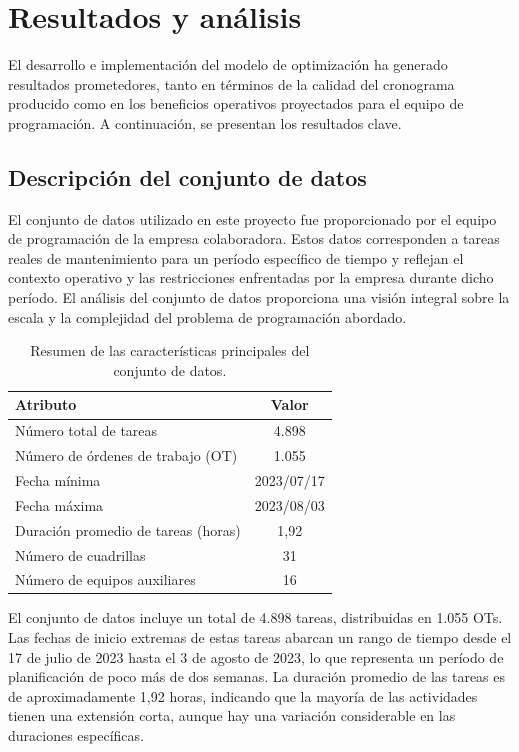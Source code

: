 \documentclass{article}
\begin{document}
\section{Resultados y análisis}

El desarrollo e implementación del modelo de optimización ha generado resultados prometedores, tanto en términos de la calidad del cronograma producido como en los beneficios operativos proyectados para el equipo de programación. A continuación, se presentan los resultados clave.


\subsection{Descripción del conjunto de datos}

El conjunto de datos utilizado en este proyecto fue proporcionado por el equipo de programación de la empresa colaboradora. Estos datos corresponden a tareas reales de mantenimiento para un período específico de tiempo y reflejan el contexto operativo y las restricciones enfrentadas por la empresa durante dicho período. El análisis del conjunto de datos proporciona una visión integral sobre la escala y la complejidad del problema de programación abordado.

\begin{table}[htbp]
    \centering
    \begin{tabular}{lc}
        \toprule
        \textbf{Atributo} & \textbf{Valor} \\
        \midrule
        Número total de tareas & 4.898 \\
        Número de órdenes de trabajo (OT) & 1.055 \\
        Fecha mínima & 2023/07/17 \\
        Fecha máxima & 2023/08/03 \\
        Duración promedio de tareas (horas) & 1,92 \\
        Número de cuadrillas & 31 \\
        Número de equipos auxiliares & 16 \\
        \bottomrule
    \end{tabular}
    \caption{Resumen de las características principales del conjunto de datos.}
    \label{tab:dataset_summary}
\end{table}


El conjunto de datos incluye un total de 4.898 tareas, distribuidas en 1.055 OTs. Las fechas de inicio extremas de estas tareas abarcan un rango de tiempo desde el 17 de julio de 2023 hasta el 3 de agosto de 2023, lo que representa un período de planificación de poco más de dos semanas. La duración promedio de las tareas es de aproximadamente 1,92 horas, indicando que la mayoría de las actividades tienen una extensión corta, aunque hay una variación considerable en las duraciones específicas.
\end{document}
